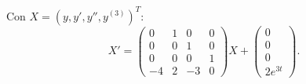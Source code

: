 Con $X=(y,y',y'',y^{(3)})^T$:
\[X'=\begin{pmatrix}0&1&0&0\\0&0&1&0\\0&0&0&1\\-4&2&-3&0\end{pmatrix}X+\begin{pmatrix}0\\0\\0\\2e^{3t}\end{pmatrix}.\]

